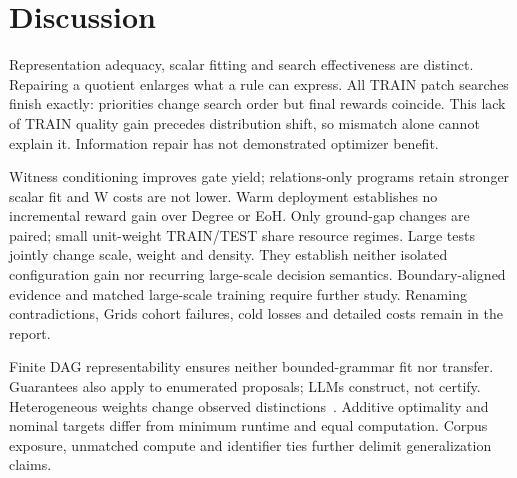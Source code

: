 \section{Discussion}
\label{sec:discussion}
Representation adequacy, scalar fitting and search effectiveness are distinct.
Repairing a quotient enlarges what a rule can express. All TRAIN patch searches
finish exactly: priorities change search order but final rewards coincide.
This lack of TRAIN quality gain precedes distribution shift, so mismatch alone
cannot explain it. Information repair has not demonstrated optimizer benefit.

Witness conditioning improves gate yield; relations-only programs retain
stronger scalar fit and W costs are not lower. Warm deployment establishes no
incremental reward gain over Degree or EoH. Only ground-gap changes are paired;
small unit-weight TRAIN/TEST share resource regimes. Large tests jointly change
scale, weight and density. They establish neither isolated configuration gain
nor recurring large-scale decision semantics. Boundary-aligned evidence and
matched large-scale training require further study. Renaming contradictions,
Grids cohort failures, cold losses and detailed costs remain in the report.

Finite DAG representability ensures neither bounded-grammar fit nor transfer.
Guarantees also apply to enumerated proposals; LLMs construct, not certify.
Heterogeneous weights change observed distinctions~\cite{mccreesh2017evaluation}.
Additive optimality and nominal targets differ from minimum runtime and equal
computation. Corpus exposure, unmatched compute and identifier ties further
delimit generalization claims.
